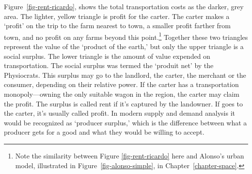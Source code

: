 Figure~\ref{fig-rent-ricardo}, shows the total transportation costs as the darker, grey area. The lighter,  yellow triangle is profit for the carter. The carter makes a `profit' on the trip to the farm nearest to town, a smaller profit farther from town, and no profit on any farms beyond this point.\footnote{Note the similarity between Figure \ref{fig-rent-ricardo} here and Alonso's urban model, illustrated in Figure~\ref{fig-alonso-simple}, in Chapter~\ref{chapter-space}.} 
Together these two triangles represent the  value of the `product of the earth,' but only the upper triangle is a social \gls{surplus}. The lower triangle is the amount of value expended on transportation. The social surplus was termed the `\gls{produit net}' by the Physiocrats. This surplus may go to the landlord, the carter, the merchant or the consumer, depending %
on their relative power. 
If the carter has a transportation monopoly---owning the only suitable wagon in the region, the carter may claim the profit. The surplus is called rent if it's captured by the landowner. If goes to the carter, it's usually called profit. In modern supply and demand analysis it would be recognized as `\gls{producer surplus},' which is the difference between what a producer gets for a good and what they would be willing to accept. 



